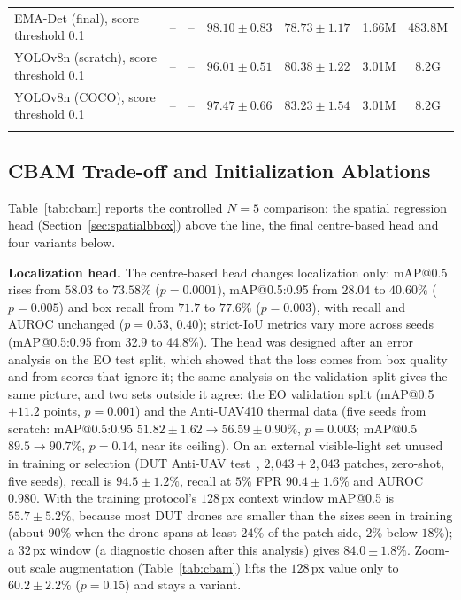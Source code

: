 \documentclass[pdflatex,sn-mathphys-num,iicol]{sn-jnl}%
\begin{document}
\begin{table}[t]
{\begin{tabular}{lcccccc}
\midrule
EMA-Det (final), score threshold 0.1 & -- & -- & $98.10{\pm}0.83$ & $78.73{\pm}1.17$ & 1.66M & 483.8M \\
YOLOv8n (scratch), score threshold 0.1 & -- & -- & $96.01{\pm}0.51$ & $80.38{\pm}1.22$ & 3.01M & 8.2G \\
YOLOv8n (COCO), score threshold 0.1 & -- & -- & $97.47{\pm}0.66$ & $83.23{\pm}1.54$ & 3.01M & 8.2G \\
\botrule
\end{tabular}}
\end{table}

\subsection{CBAM Trade-off and Initialization Ablations}\label{sec:cbam}

 Table~\ref{tab:cbam} reports the controlled $N{=}5$ comparison: the spatial regression head
(Section~\ref{sec:spatialbbox}) above the line, the final centre-based head and four variants below.

 \textbf{Localization head.} The centre-based head changes localization only:
mAP@0.5 rises from $58.03$ to $73.58\%$ ($p=0.0001$), mAP@0.5:0.95 from $28.04$ to
$40.60\%$ ($p=0.005$) and box recall from $71.7$ to $77.6\%$ ($p=0.003$), with recall
and AUROC unchanged ($p=0.53$, $0.40$); strict-IoU metrics vary more across seeds
(mAP@0.5:0.95 from 32.9 to 44.8\%). The head was designed after an error
analysis on the EO test split, which showed that the loss comes from box quality and
from scores that ignore it; the same analysis on the validation split gives the same
picture, and two sets outside it agree: the EO validation split (mAP@0.5 $+11.2$ points,
$p=0.001$) and the Anti-UAV410 thermal data (five seeds from scratch: mAP@0.5:0.95
$51.82\pm1.62\to56.59\pm0.90\%$, $p=0.003$; mAP@0.5
$89.5\to90.7\%$, $p=0.14$, near its ceiling). On an external visible-light set unused in training or selection (DUT Anti-UAV test~\cite{zhao2022antiuav}, $2{,}043+2{,}043$ patches, zero-shot, five seeds), recall is $94.5\pm1.2\%$, recall at $5\%$ FPR $90.4\pm1.6\%$ and AUROC $0.980$. With the training protocol's $128$\,px context window mAP@0.5 is $55.7\pm5.2\%$, because most DUT drones are smaller than the sizes seen in training (about $90\%$ when the drone spans at least $24\%$ of the patch side, $2\%$ below $18\%$); a $32$\,px window (a diagnostic chosen after this analysis) gives $84.0\pm1.8\%$. Zoom-out scale augmentation (Table~\ref{tab:cbam}) lifts the $128$\,px value only to $60.2\pm2.2\%$ ($p{=}0.15$) and stays a variant.
\end{document}
